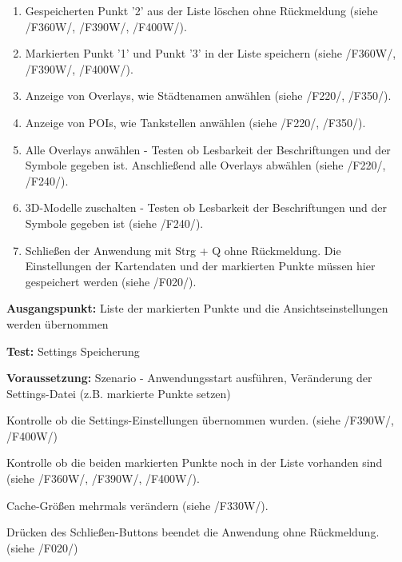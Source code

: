 \documentclass[10pt]{scrreprt}
\newcommand{\sfbf}[1]{\textbf{\sffamily #1}}
\newcommand{\ziel}[1]{{\fontsize{9.5}{11}\textsf{/#1/}}}
\newcommand{\ziellabel}{Z}
\newcommand{\muss}{\renewcommand{\labelenumi}{\textbf{\ziel{\ziellabel\numprint{\theenumi}0}}}}
\newcommand{\wunsch}{\renewcommand{\labelenumi}{\textbf{\ziel{\ziellabel\numprint{\theenumi}0W}}}}
\newenvironment{details}[1][6pt]{%
  \parskip#1 \parindent6mm \raggedright%
  \def\item{\par\ignorespaces\hangindent=5mm \hangafter1}}{%
  \par\ignorespaces}
\begin{document}
\begin{enumerate}[leftmargin = 2.2cm, resume]
\item Gespeicherten Punkt '2' aus der Liste löschen ohne Rückmeldung (siehe \ziel{F360W}, \ziel{F390W}, \ziel{F400W}).
\item Markierten Punkt '1' und Punkt '3' in der Liste speichern (siehe \ziel{F360W}, \ziel{F390W}, \ziel{F400W}).
\muss
\item Anzeige von Overlays, wie Städtenamen anwählen (siehe \ziel{F220}, \ziel{F350}).
\item Anzeige von POIs, wie Tankstellen anwählen (siehe \ziel{F220}, \ziel{F350}).
\item Alle Overlays anwählen - Testen ob Lesbarkeit der Beschriftungen und der Symbole gegeben ist. Anschließend alle Overlays abwählen (siehe \ziel{F220}, \ziel{F240}).
\item 3D-Modelle zuschalten - Testen ob Lesbarkeit der Beschriftungen und der Symbole gegeben ist (siehe \ziel{F240}).
\item  Schließen der Anwendung mit Strg + Q ohne Rückmeldung. Die Einstellungen der Kartendaten und der markierten Punkte müssen hier gespeichert werden (siehe \ziel{F020}).
\end{enumerate}

\vspace{1.0cm}
\begin{details}[2pt]
\item \sfbf{Ausgangspunkt:} Liste der markierten Punkte und die Ansichtseinstellungen werden übernommen
\item \sfbf{Test:} Settings Speicherung
\item \sfbf{Voraussetzung:} Szenario - Anwendungsstart ausführen, Veränderung der Settings-Datei (z.B. markierte Punkte setzen)
\end{details}
\vspace{2mm}
\begin{enumerate}[leftmargin = 2.2cm, resume]
\wunsch
\item Kontrolle ob die Settings-Einstellungen übernommen wurden. (siehe \ziel{F390W}, \ziel{F400W})
\item Kontrolle ob die beiden markierten Punkte noch in der Liste vorhanden sind (siehe \ziel{F360W}, \ziel{F390W}, \ziel{F400W}).
\item Cache-Größen mehrmals verändern (siehe \ziel{F330W}).
\muss
\item Drücken des Schließen-Buttons beendet die Anwendung ohne Rückmeldung. (siehe \ziel{F020})
\end{enumerate}
\end{document}

